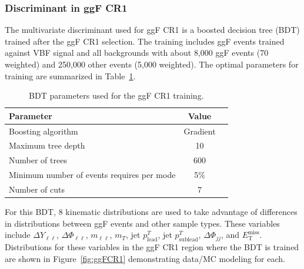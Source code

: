 \newpage

\subsubsection{Discriminant in ggF CR1}
The multivariate discriminant used for ggF CR1 is a boosted decision tree (BDT) trained after the ggF CR1 selection. The training includes ggF events trained against VBF signal and all backgrounds with about 8,000 ggF events (70 weighted) and 250,000 other events (5,000 weighted). The optimal parameters for training are summarized in Table~\ref{tab:ggFCR1BDTparameters}.
\begin{table}[h!]
\centering
\begin{tabular}{|l|c|c|}
\hline
Parameter                                    & Value     \\
\hline
Boosting algorithm                           & Gradient \\
Maximum tree depth                           &  10      \\
Number of trees                              &  600    \\
Minimum number of events requires per mode   &  5\%     \\ 
Number of cuts                               &  7       \\
\hline
\end{tabular}
\caption{BDT parameters used for the ggF CR1 training.}
\label{tab:ggFCR1BDTparameters}
\end{table}
 
For this BDT, 8 kinematic distributions are used to take advantage of differences in distributions between ggF events and other sample types. These variables include $\Delta Y_{\ell\ell}$, $\Delta \Phi_{\ell\ell}$, $m_{\ell\ell}$, $m_T$, jet $p^T_{\text{lead}}$, jet $p^T_{\text{sublead}}$, $\Delta \Phi_{jj}$, and $\ensuremath{E_{\text{T}}^{\text{miss}}}$. Distributions for these variables in the ggF CR1 region where the BDT is trained are shown in Figure~\ref{fig:ggFCR1} demonstrating data/MC modeling for each.

